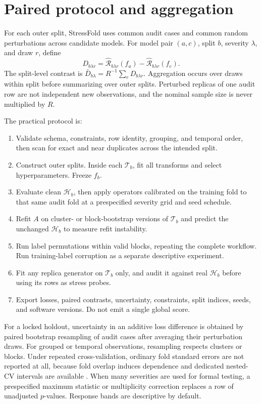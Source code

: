 \documentclass[10pt,twocolumn]{article}
\newcommand{\risk}{\mathcal{R}}
\newcommand{\train}{\mathcal{T}}
\newcommand{\audit}{\mathcal{H}}
\begin{document}
\section{Paired protocol and aggregation}

For each outer split, StressFold uses common audit cases and common random perturbations across candidate models. For model pair \((a,c)\), split \(b\), severity \(\lambda\), and draw \(r\), define
\begin{equation}
  D_{b\lambda r}=\widehat{\risk}_{b\lambda r}(f_a)
                     -\widehat{\risk}_{b\lambda r}(f_c).
\end{equation}
The split-level contrast is \(\bar D_{b\lambda}=R^{-1}\sum_rD_{b\lambda r}\). Aggregation occurs over draws within split before summarizing over outer splits. Perturbed replicas of one audit row are not independent new observations, and the nominal sample size is never multiplied by \(R\).

The practical protocol is:
\begin{enumerate}
  \item Validate schema, constraints, row identity, grouping, and temporal order, then scan for exact and near duplicates across the intended split.
  \item Construct outer splits. Inside each \(\train_b\), fit all transforms and select hyperparameters. Freeze \(f_b\).
  \item Evaluate clean \(\audit_b\), then apply operators calibrated on the training fold to that same audit fold at a prespecified severity grid and seed schedule.
  \item Refit \(A\) on cluster- or block-bootstrap versions of \(\train_b\) and predict the unchanged \(\audit_b\) to measure refit instability.
  \item Run label permutations within valid blocks, repeating the complete workflow. Run training-label corruption as a separate descriptive experiment.
  \item Fit any replica generator on \(\train_b\) only, and audit it against real \(\audit_b\) before using its rows as stress probes.
  \item Export losses, paired contrasts, uncertainty, constraints, split indices, seeds, and software versions. Do not emit a single global score.
\end{enumerate}

For a locked holdout, uncertainty in an additive loss difference is obtained by paired bootstrap resampling of audit cases after averaging their perturbation draws. For grouped or temporal observations, resampling respects clusters or blocks. Under repeated cross-validation, ordinary fold standard errors are not reported at all, because fold overlap induces dependence and dedicated nested-CV intervals are available \citep{bates2024crossvalidation}. When many severities are used for formal testing, a prespecified maximum statistic or multiplicity correction replaces a row of unadjusted \(p\)-values. Response bands are descriptive by default.
\end{document}
